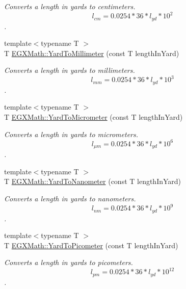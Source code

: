 \begin{DoxyCompactItemize}
\begin{DoxyCompactList}\small\item\em Converts a length in yards to centimeters. \[ l_{cm}=0.0254 * 36 * l_{yd} * 10^{2} \]. \end{DoxyCompactList}\item 
{\footnotesize template$<$typename T $>$ }\\T \mbox{\hyperlink{group___e_g_x_math-_conversions-_length_conversions-_imperial-_yard-_s_i_ga54f92a3a4238cd856ba21bdf1fe65d23}{E\+G\+X\+Math\+::\+Yard\+To\+Millimeter}} (const T length\+In\+Yard)
\begin{DoxyCompactList}\small\item\em Converts a length in yards to millimeters. \[ l_{mm}=0.0254 * 36 * l_{yd} * 10^{3} \]. \end{DoxyCompactList}\item 
{\footnotesize template$<$typename T $>$ }\\T \mbox{\hyperlink{group___e_g_x_math-_conversions-_length_conversions-_imperial-_yard-_s_i_ga9197b0613b2b3a04b62d194f04bb3692}{E\+G\+X\+Math\+::\+Yard\+To\+Micrometer}} (const T length\+In\+Yard)
\begin{DoxyCompactList}\small\item\em Converts a length in yards to micrometers. \[ l_{\mu m}=0.0254 * 36 * l_{yd} * 10^{6} \]. \end{DoxyCompactList}\item 
{\footnotesize template$<$typename T $>$ }\\T \mbox{\hyperlink{group___e_g_x_math-_conversions-_length_conversions-_imperial-_yard-_s_i_ga0cf6f8b8eb4601031f00134232ca3cc1}{E\+G\+X\+Math\+::\+Yard\+To\+Nanometer}} (const T length\+In\+Yard)
\begin{DoxyCompactList}\small\item\em Converts a length in yards to nanometers. \[ l_{nm}=0.0254 * 36 * l_{yd} * 10^{9} \]. \end{DoxyCompactList}\item 
{\footnotesize template$<$typename T $>$ }\\T \mbox{\hyperlink{group___e_g_x_math-_conversions-_length_conversions-_imperial-_yard-_s_i_ga1d0bc498fe3ed1693555aa6917abb758}{E\+G\+X\+Math\+::\+Yard\+To\+Picometer}} (const T length\+In\+Yard)
\begin{DoxyCompactList}\small\item\em Converts a length in yards to picometers. \[ l_{pm}=0.0254 * 36 * l_{yd} * 10^{12} \]. \end{DoxyCompactList}\item 

\end{DoxyCompactItemize}
